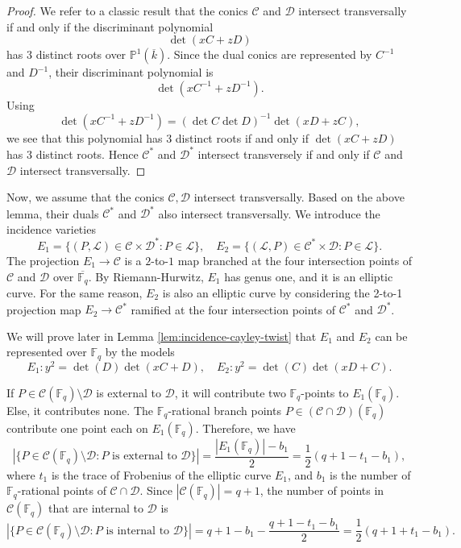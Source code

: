 \documentclass[11pt]{article}
\theoremstyle{definition}
\theoremstyle{definition}
\begin{document}
\begin{proof}
We refer to a classic result \cite[Proposition 22.34]{harrisag} that the conics $\mathcal{C}$ and $\mathcal{D}$ intersect transversally if and only if
the discriminant polynomial 
$$\det(xC+zD)$$
has $3$ distinct roots over 
\(\mathbb{P}^1(\overline{k})\). Since the dual conics are represented by \(C^{-1}\) and \(D^{-1}\), their discriminant
polynomial is
\[
\det(xC^{-1}+zD^{-1}).
\]
Using
\[
\det(xC^{-1}+zD^{-1})
=
(\det C\det D)^{-1}\det(xD+zC),
\]
we see that this polynomial has $3$ distinct roots if and only if
\(\det(xC+zD)\) has $3$ distinct roots. Hence \(\mathcal C^*\) and
\(\mathcal D^*\) intersect transversely if and only if $\mathcal C$ and $\mathcal D$ intersect transversally.
\end{proof}

Now, we assume that the conics $\mathcal{C}, \mathcal{D}$ intersect transversally. Based on the above lemma, their duals $\mathcal{C}^*$ and $\mathcal{D}^*$ also intersect transversally. We introduce the incidence varieties
$$E_1 = \{(P, \mathcal L)\in \mathcal C\times\mathcal D^* : P\in \mathcal L\}, \quad E_2 = \{(\mathcal L, P)\in\mathcal{C}^*\times\mathcal{D}: P\in\mathcal{L}\}.$$
The projection \(E_1\to\mathcal C\) is a $2$-to-$1$ map branched at the four intersection points of $\mathcal{C}$ and $\mathcal{D}$ over $\overline{\mathbb{F}_q}$. By Riemann-Hurwitz, \(E_1\) has genus one, and it is an elliptic curve. For the same reason, $E_2$ is also an elliptic curve by considering the 2-to-1 projection map $E_2\to \mathcal{C}^*$ ramified at the four intersection points of $\mathcal{C}^*$ and $\mathcal{D}^*$.

We will prove later in Lemma \ref{lem:incidence-cayley-twist} that $E_1$ and $E_2$ can be represented over $\mathbb{F}_q$ by the models
$$E_1: y^2 = \det(D)\det(xC+D), \quad
E_2: y^2 = \det(C)\det(xD+C).$$

If \(P\in \mathcal C(\mathbb F_q)\setminus\mathcal D\) is external to $\mathcal{D}$, it will contribute
two \(\mathbb F_q\)-points to \(E_1(\mathbb F_q)\). Else, it contributes none. The $\mathbb{F}_q$-rational branch points \(P\in(\mathcal C\cap\mathcal D)(\mathbb F_q)\) contribute one point each on $E_1(\mathbb{F}_q)$. Therefore, we have 
$$|\{P\in \mathcal{C}(\mathbb{F}_q)\setminus\mathcal{D}: P \text{ is external to } \mathcal{D} \}|=\frac{|E_1(\mathbb F_q)|-b_1}{2}=\frac{1}{2}(q+1-t_1-b_1),$$
where $t_1$ is the trace of Frobenius of the elliptic curve $E_1$, and $b_1$ is the number of $\mathbb{F}_q$-rational points of $\mathcal{C}\cap\mathcal{D}$. Since \(|\mathcal C(\mathbb F_q)|=q+1\), the number of points in $\mathcal{C}(\mathbb{F}_q)$ that are internal to $\mathcal{D}$ is
$$|\{P\in \mathcal{C}(\mathbb{F}_q)\setminus\mathcal D: P \text{ is internal to } \mathcal{D} \}| = q+1-b_1-\frac{q+1-t_1-b_1}{2} = \frac{1}{2}(q+1+t_1-b_1).$$
\end{document}
